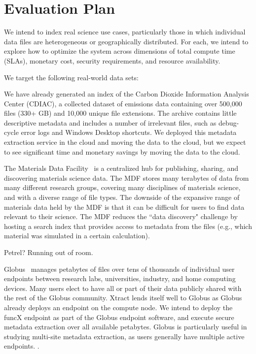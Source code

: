 \documentclass[sigconf]{acmart}
\newcommand{\tyler}[1]{}
\newcommand{\kyle}[1]{}
\newcommand{\tyler}[1]{{\textcolor{cyan}{ tyler: #1 }}}
\newcommand{\kyle}[1]{{\textcolor{purple}{ Kyle: #1 }}}
\begin{document}
\section{Evaluation Plan}
\label{sec:eval}

We intend to index real science use cases, particularly those in which individual data files are heterogeneous 
or geographically distributed. For each, we intend to explore how to optimize the system across dimensions of 
total compute time (SLAs), monetary cost, security requirements, and resource availability.

We target the following real-world data sets: 

We have already generated an index of the Carbon Dioxide Information Analysis Center (CDIAC), a collected dataset of 
emissions data containing over 500,000 files (330+ GB) and 10,000 unique file extensions. The archive contains little 
descriptive metadata and includes a number of irrelevant files, such as debug-cycle error logs and Windows Desktop 
shortcuts.  We deployed this metadata extraction service in the cloud and moving the data to the cloud, but we expect 
to see significant time and monetary savings by moving the data to the cloud.  

The Materials Data Facility~\cite{blaiszik2016materials, blaiszik2019mdf}
is a centralized hub for publishing, sharing, and discovering materials science data. 
The MDF stores many terabytes of data from many different research groups, covering many disciplines of 
materials science, and with a diverse range of file types.
The downside of the expansive range of materials data held by the MDF 
is that it can be difficult for users to find data relevant to their science.
The MDF reduces the ``data discovery" challenge by hosting a search index that provides access to metadata from the 
files (e.g., which material was simulated in a certain calculation).

Petrel? Running out of room. 

Globus~\cite{ananthakrishnan2018globus} manages petabytes of files over tens of thousands of individual user endpoints between research labs, 
universities, industry, and home computing devices. Many \tyler{???} users elect to have all or part of their data publicly 
shared with the rest of the Globus community. \kyle{private sharing could also be indexed} Xtract lends itself well to Globus as Globus already deploys an 
endpoint on the compute node.  We intend to deploy the funcX endpoint as part of the Globus endpoint software, and 
execute secure metadata extraction over all available petabytes. Globus is particularly useful in studying multi-site 
metadata extraction, as users generally have multiple active endpoints. \tyler{more detail}. 
\end{document}
